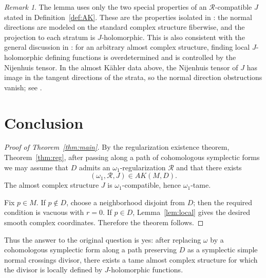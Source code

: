 \documentclass[11pt]{article}
\theoremstyle{remark}
\newtheorem{remark}{Remark}
\begin{document}
\begin{remark}
The lemma uses only the two special properties of an $\mathcal R$-compatible $J$ stated in Definition~\ref{def:AK}. These are the properties isolated in \cite{TMZ18}: the normal directions are modeled on the standard complex structure fiberwise, and the projection to each stratum is $J$-holomorphic. This is also consistent with the general discussion in \cite{MO}: for an arbitrary almost complex structure, finding local $J$-holomorphic defining functions is overdetermined and is controlled by the Nijenhuis tensor. In the almost K\"ahler data above, the Nijenhuis tensor of $J$ has image in the tangent directions of the strata, so the normal direction obstructions vanish; see \cite{TMZ18}.
\end{remark}

\section{Conclusion}

\begin{proof}[Proof of Theorem~\ref{thm:main}]
By the regularization existence theorem, Theorem~\ref{thm:reg}, after passing along a path of cohomologous symplectic forms we may assume that $D$ admits an $\omega_1$-regularization $\mathcal R$ and that there exists
\[
(\omega_1,\mathcal R,J)\in AK(M,D).
\]
The almost complex structure $J$ is $\omega_1$-compatible, hence $\omega_1$-tame.

Fix $p\in M$. If $p\notin D$, choose a neighborhood disjoint from $D$; then the required condition is vacuous with $r=0$. If $p\in D$, Lemma~\ref{lem:local} gives the desired smooth complex coordinates. Therefore the theorem follows.
\end{proof}

Thus the answer to the original question is yes: after replacing $\omega$ by a cohomologous symplectic form along a path preserving $D$ as a symplectic simple normal crossings divisor, there exists a tame almost complex structure for which the divisor is locally defined by $J$-holomorphic functions.
\end{document}
